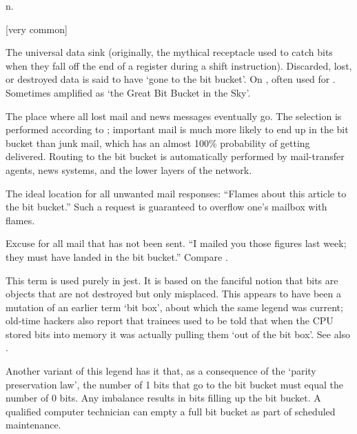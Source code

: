  n.

[very common]
\begin{inparaenum}
    \item The universal data sink (originally, the mythical receptacle used to
        catch bits when they fall off the end of a register during a shift
        instruction). Discarded, lost, or destroyed data is said to have `gone
        to the bit bucket'. On , often used for
        . Sometimes amplified as `the Great Bit Bucket in
        the Sky'.
    \item The place where all lost mail and news messages eventually go. The
        selection is performed according to ; important
        mail is much more likely to end up in the bit bucket than junk mail,
        which has an almost 100\% probability of getting delivered. Routing to
        the bit bucket is automatically performed by mail-transfer agents, news
        systems, and the lower layers of the network.
    \item The ideal location for all unwanted mail responses: ``Flames about
        this article to the bit bucket.'' Such a request is guaranteed to
        overflow one's mailbox with flames.
    \item Excuse for all mail that has not been sent. ``I mailed you those
        figures last week; they must have landed in the bit bucket.'' Compare
        .
\end{inparaenum}

This term is used purely in jest. It is based on the fanciful notion that bits
are objects that are not destroyed but only misplaced. This appears to have been
a mutation of an earlier term `bit box', about which the same legend was
current; old-time hackers also report that trainees used to be told that when
the CPU stored bits into memory it was actually pulling them `out of the bit
box'. See also .

Another variant of this legend has it that, as a consequence of the `parity
preservation law', the number of 1 bits that go to the bit bucket must equal the
number of 0 bits. Any imbalance results in bits filling up the bit bucket. A
qualified computer technician can empty a full bit bucket as part of scheduled
maintenance.


